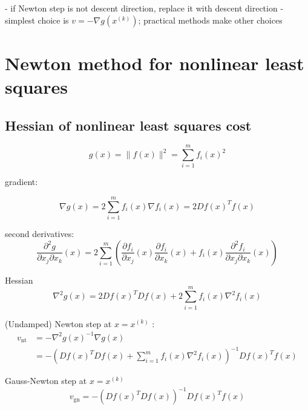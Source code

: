 
- if Newton step is not descent direction, replace it with descent direction
- simplest choice is $ v=-\nabla g\left(x^{(k)}\right) $; practical methods make other choices

\section{Newton method for nonlinear least squares}

\subsection{Hessian of nonlinear least squares cost}

$$
g(x)=\|f(x)\|^{2}=\sum_{i=1}^{m} f_{i}(x)^{2}
$$

\begin{theorem}
   gradient:

$$
\nabla g(x)=2 \sum_{i=1}^{m} f_{i}(x) \nabla f_{i}(x)=2 D f(x)^{T} f(x)
$$ 
\end{theorem}

\begin{theorem}
    second derivatives:
$$
\frac{\partial^{2} g}{\partial x_{j} \partial x_{k}}(x)=2 \sum_{i=1}^{m}\left(\frac{\partial f_{i}}{\partial x_{j}}(x) \frac{\partial f_{i}}{\partial x_{k}}(x)+f_{i}(x) \frac{\partial^{2} f_{i}}{\partial x_{j} \partial x_{k}}(x)\right)
$$
\end{theorem}

\begin{theorem}
    Hessian
$$
\nabla^{2} g(x)=2 D f(x)^{T} D f(x)+2 \sum_{i=1}^{m} f_{i}(x) \nabla^{2} f_{i}(x)
$$
\end{theorem}

\begin{theorem}
    (Undamped) Newton step at $ x=x^{(k)} $ :
$$
\begin{aligned}
v_{\mathrm{nt}} &=-\nabla^{2} g(x)^{-1} \nabla g(x) \\
&=-\left(D f(x)^{T} D f(x)+\sum_{i=1}^{m} f_{i}(x) \nabla^{2} f_{i}(x)\right)^{-1} D f(x)^{T} f(x)
\end{aligned}
$$

\end{theorem}

\begin{theorem}
    Gauss-Newton step at $ x=x^{(k)} $
$$
v_{\mathrm{gn}}=-\left(D f(x)^{T} D f(x)\right)^{-1} D f(x)^{T} f(x)
$$
\end{theorem}

